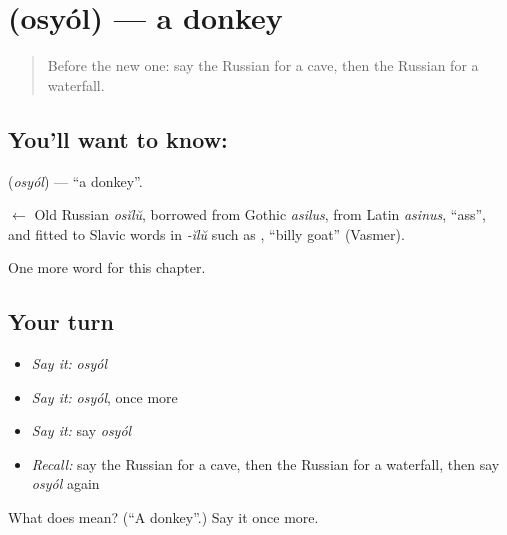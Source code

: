\section[\texorpdfstring{\ru{осёл} (osyól)}{осёл (osyól)}]{ (osyól) — a donkey}

\label{lesson:RU-C116-donkey}



\begin{quote}
Before the new one: say the Russian for a cave, then the Russian for a waterfall.
\end{quote}

\subsection*{You'll want to know: }
\textbf{} (\emph{osyól}) — \textquotedblleft{}a donkey\textquotedblright{}.

\begin{cousinweb}
\textbf{} $\leftarrow$ Old Russian \emph{osĭlŭ}, borrowed from Gothic \emph{asilus}, from Latin \emph{asinus}, \textquotedblleft{}ass\textquotedblright{}, and fitted to Slavic words in \emph{-ĭlŭ} such as \emph{}, \textquotedblleft{}billy goat\textquotedblright{} (Vasmer).
\end{cousinweb}

\begin{grammarlens}[title={What you've built}]
One more word for this chapter.
\end{grammarlens}

\subsection*{Your turn}
\begin{itemize}
\raggedright
  \item \emph{Say it:} \emph{osyól}
  \item \emph{Say it:} \emph{osyól}, once more
  \item \emph{Say it:} say \emph{osyól}
  \item \emph{Recall:} say the Russian for a cave, then the Russian for a waterfall, then say \emph{osyól} again
\end{itemize}

\begin{tcolorbox}[breakable,colback=teal!4,colframe=teal!35!black,title={Before you move on}]
What does  mean? (\textquotedblleft{}A donkey\textquotedblright{}.) Say it once more.
\end{tcolorbox}
